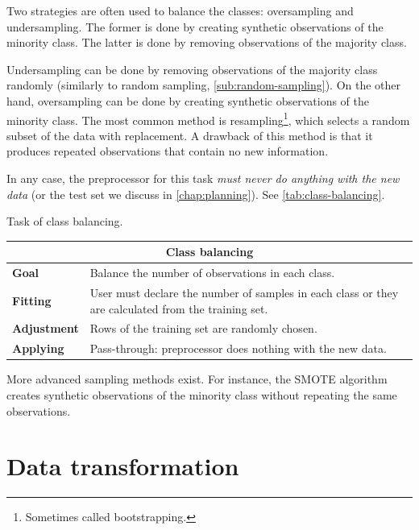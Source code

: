Two strategies are often used to balance the classes: oversampling and undersampling.  The
former is done by creating synthetic observations of the minority class.  The latter is
done by removing observations of the majority class.

Undersampling can be done by removing observations of the majority class randomly
(similarly to random sampling, \cref{sub:random-sampling}).  On the other hand,
oversampling can be done by creating synthetic observations of the minority class.  The
most common method is resampling\footnote{Sometimes called bootstrapping.}, which selects
a random subset of the data with replacement.  A drawback of this method is that it
produces repeated observations that contain no new information.

In any case, the \gls{preprocessor} for this task \emph{must never do anything with the new
data} (or the test set we discuss in \cref{chap:planning}).  See
\cref{tab:class-balancing}.

\begin{tablebox}[label=tab:class-balancing]{Task of class balancing.}
  \centering
  \begin{tabular}{lp{6cm}}
    \toprule
    \multicolumn{2}{c}{\textbf{Class balancing}} \\
    \midrule
    \textbf{Goal} &
      Balance the number of observations in each class. \\
    \textbf{Fitting} &
      User must declare the number of samples in each class or
      they are calculated from the training set.  \\
    \textbf{Adjustment} &
      Rows of the training set are randomly chosen. \\
    \textbf{Applying} &
      Pass-through: \gls{preprocessor} does nothing with the new data. \\
    \bottomrule
  \end{tabular}
\end{tablebox}

More advanced sampling methods exist.  For instance, the SMOTE
algorithm creates synthetic observations of the minority
class without repeating the same observations.

\section{Data transformation}

